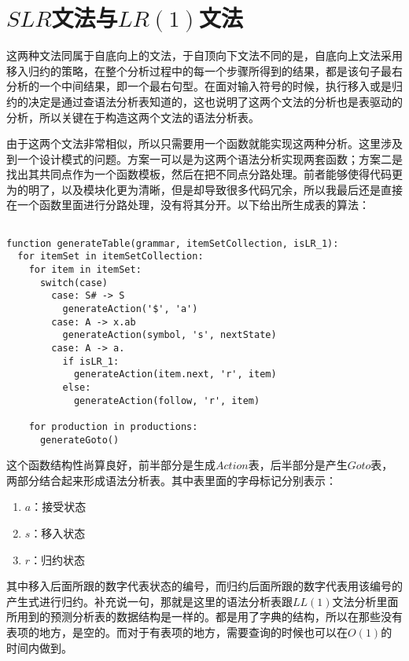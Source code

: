 \section{$SLR$文法与$LR(1)$文法}

这两种文法同属于自底向上的文法，于自顶向下文法不同的是，自底向上文法采用移入归约的策略，在整个分析过程中的每一个步骤所得到的结果，都是该句子最右分析的一个中间结果，即一个最右句型。在面对输入符号的时候，执行移入或是归约的决定是通过查语法分析表知道的，这也说明了这两个文法的分析也是表驱动的分析，所以关键在于构造这两个文法的语法分析表。

由于这两个文法非常相似，所以只需要用一个函数就能实现这两种分析。这里涉及到一个设计模式的问题。方案一可以是为这两个语法分析实现两套函数；方案二是找出其共同点作为一个函数模板，然后在把不同点分路处理。前者能够使得代码更为的明了，以及模块化更为清晰，但是却导致很多代码冗余，所以我最后还是直接在一个函数里面进行分路处理，没有将其分开。以下给出所生成表的算法：

\begin{verbatim}

function generateTable(grammar, itemSetCollection, isLR_1):
  for itemSet in itemSetCollection:
    for item in itemSet:
      switch(case)
        case: S# -> S
          generateAction('$', 'a')
        case: A -> x.ab
          generateAction(symbol, 's', nextState)
        case: A -> a.
          if isLR_1:
            generateAction(item.next, 'r', item)
          else:
            generateAction(follow, 'r', item)

    for production in productions:
      generateGoto()

\end{verbatim}

这个函数结构性尚算良好，前半部分是生成$Action$表，后半部分是产生$Goto$表，两部分结合起来形成语法分析表。其中表里面的字母标记分别表示：

\begin{enumerate}
    \item $a$：接受状态
    \item $s$：移入状态
    \item $r$：归约状态
\end{enumerate}

其中移入后面所跟的数字代表状态的编号，而归约后面所跟的数字代表用该编号的产生式进行归约。补充说一句，那就是这里的语法分析表跟$LL(1)$文法分析里面所用到的预测分析表的数据结构是一样的。都是用了字典的结构，所以在那些没有表项的地方，是空的。而对于有表项的地方，需要查询的时候也可以在$O(1)$的时间内做到。

\newpage

